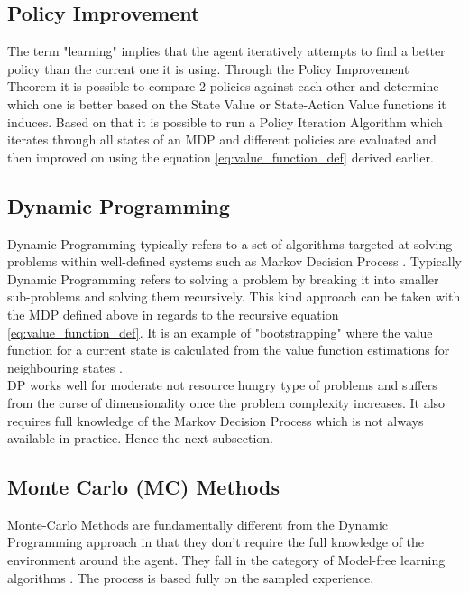 \subsection{Policy Improvement}

The term "learning" implies that the agent iteratively attempts 
to find a better policy than the current one it is using. 
Through the Policy Improvement Theorem \cite{lecture_dp} it is 
possible to compare 2 policies against each other and determine
which one is better based on the State Value or State-Action
Value functions it induces. Based on that it is possible to run a
Policy Iteration Algorithm \cite{lecture_dp} which iterates
through all states of an MDP and different policies are evaluated and then improved on using the equation \ref{eq:value_function_def} derived earlier.

\subsection{Dynamic Programming}

Dynamic Programming typically refers to a set of algorithms targeted at solving problems within well-defined systems such as Markov Decision Process \cite{lecture_dp}. Typically Dynamic Programming refers to solving a problem by breaking it into smaller sub-problems and solving them recursively. This kind
approach can be taken with the MDP defined above in regards to 
the recursive equation \ref{eq:value_function_def}. It is an
example of "bootstrapping" where the value function
for a current state is calculated from the value function 
estimations for neighbouring states \cite{lecture_dp}. \\

DP works well for moderate not resource hungry type of problems and suffers from the curse of dimensionality once the problem complexity increases. It also requires full knowledge of the Markov Decision Process which is not always available in practice. Hence the next subsection. 

\subsection{Monte Carlo (MC) Methods}

Monte-Carlo Methods are fundamentally different from the 
Dynamic Programming approach in that they don't require the 
full knowledge of the environment around the agent. They fall
in the category of Model-free learning algorithms \cite{lecture_mfl}. The process is based fully on the sampled experience.  \\

